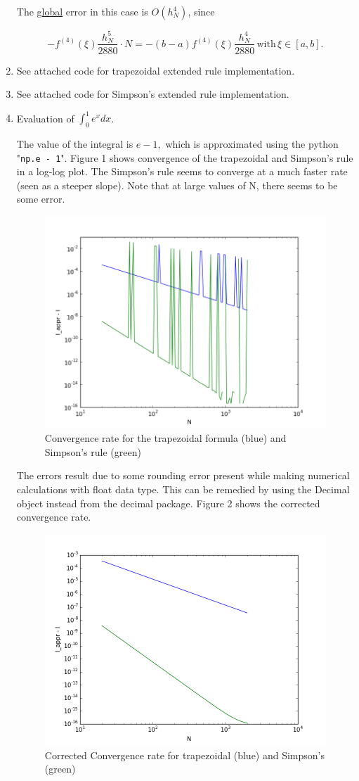 \documentclass{article}
\begin{document}
\begin{enumerate}
	The \underline{global} error in this case is $O(h_N^4)$, since
	
	\begin{equation}
		- f^{(4)}(\xi) \frac{h_N^5}{2880} \cdot N = -(b-a) f^{(4)} (\xi) \frac{h_N^4}{2880} \hspace{2pt} \text{with} \hspace{2pt} \xi \in [a,b].
	\end{equation}
	
	\item See attached code for trapezoidal extended rule implementation.
	
	\item See attached code for Simpson's extended rule implementation.
	
	\item Evaluation of $\int_0^1 e^xdx$.
	
	The value of the integral is $e - 1,$ which is approximated using the python "\texttt{np.e - 1}". Figure 1 shows convergence of the trapezoidal and Simpson's rule in a log-log plot. The Simpson's rule seems to converge at a much faster rate (seen as a steeper slope). Note that at large values of N, there seems to be some error.
	
	\begin{figure}[ht!]
		\centering
		\includegraphics[width=0.5\linewidth]{fig1.png}
		\caption{Convergence rate for the trapezoidal formula (blue) and Simpson's rule (green)}
	\end{figure}
	
	The errors result due to some rounding error present while making numerical calculations with float data type. This can be remedied by using the Decimal object instead from the decimal package. Figure 2 shows the corrected convergence rate.
	
	\begin{figure}[ht!]
		\centering
		\includegraphics[width=0.5\linewidth]{fig2.png}
		\caption{Corrected Convergence rate for trapezoidal (blue) and Simpson's (green)}
	\end{figure}
	

\end{enumerate}
\end{document}
